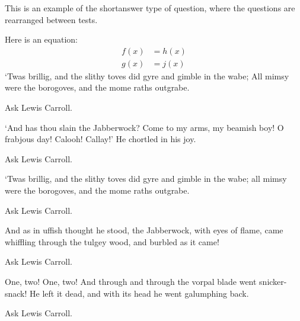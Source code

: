 \documentclass[10pt]{examdesign}
\begin{document}
\begin{shortanswer}[title={Short Answer (10 pts each)},
	rearrange=yes,resetcounter=no]
	This is an example of the \textsf{shortanswer} type of question, where the
	questions are rearranged between tests.
	
	\begin{question}
		Here is an equation:
		\begin{align}
		f(x) &= h(x)\\
		g(x) &= j(x)
		\end{align}
		`Twas brillig, and the slithy toves  did gyre and gimble in the wabe;
		All mimsy were the borogoves, and the mome raths outgrabe.
		\begin{answer}
			Ask Lewis Carroll.
		\end{answer}
	\end{question}
	
	\begin{question}
		`And has thou slain the Jabberwock? Come to my arms, my beamish boy!
		O frabjous day! Calooh! Callay!' He chortled in his joy.
		\begin{answer}
			Ask Lewis Carroll.
		\end{answer}
	\end{question}
	
	\begin{question}
		`Twas brillig, and the slithy toves did gyre and gimble in the wabe;
		all mimsy were the borogoves, and the mome raths outgrabe.
		\begin{answer}
			Ask Lewis Carroll.
		\end{answer}
	\end{question}
	
	\begin{question}
		And as in uffish thought he stood, the Jabberwock, with eyes of flame,
		came whiffling through the tulgey wood, and burbled as it came!
		\begin{answer}
			Ask Lewis Carroll.
		\end{answer}
	\end{question}
	
	\begin{question}
		One, two! One, two! And through and through the vorpal blade went snicker-snack!
		He left it dead, and with its head he went galumphing back.
		\begin{answer}
			Ask Lewis Carroll.
		\end{answer}
	\end{question}
	

\end{shortanswer}
\end{document}
